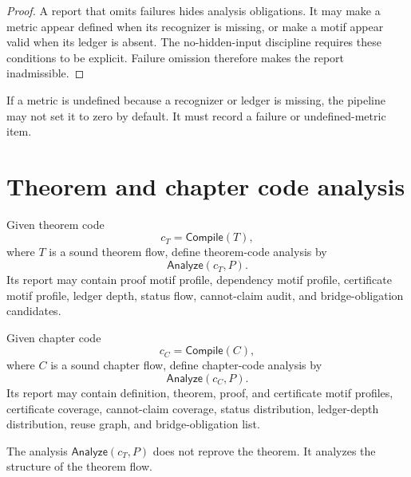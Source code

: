 \begin{proof}
A report that omits failures hides analysis obligations. It may make a metric appear defined when its recognizer is missing, or make a motif appear valid when its ledger is absent. The no-hidden-input discipline requires these conditions to be explicit. Failure omission therefore makes the report inadmissible.
\end{proof}

\begin{corollary}
\label{cor:analysis-pipeline-missing-data-not-zero}
If a metric is undefined because a recognizer or ledger is missing, the pipeline may not set it to zero by default. It must record a failure or undefined-metric item.
\end{corollary}

\section{Theorem and chapter code analysis}
\label{sec:analysis-pipeline-theorem-chapter-code}

\begin{definition}
\label{def:analysis-pipeline-theorem-code-analysis}
Given theorem code
$$
  c_T=\mathsf{Compile}(T),
$$
where $T$ is a sound theorem flow, define theorem-code analysis by
$$
  \mathsf{Analyze}(c_T,P).
$$
Its report may contain proof motif profile, dependency motif profile, certificate motif profile, ledger depth, status flow, cannot-claim audit, and bridge-obligation candidates.
\end{definition}

\begin{definition}
\label{def:analysis-pipeline-chapter-code-analysis}
Given chapter code
$$
  c_C=\mathsf{Compile}(C),
$$
where $C$ is a sound chapter flow, define chapter-code analysis by
$$
  \mathsf{Analyze}(c_C,P).
$$
Its report may contain definition, theorem, proof, and certificate motif profiles, certificate coverage, cannot-claim coverage, status distribution, ledger-depth distribution, reuse graph, and bridge-obligation list.
\end{definition}

\begin{proposition}
\label{prop:analysis-pipeline-theorem-analysis-not-reprove}
The analysis $\mathsf{Analyze}(c_T,P)$ does not reprove the theorem. It analyzes the structure of the theorem flow.
\end{proposition}

